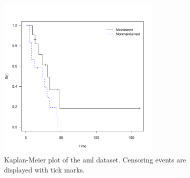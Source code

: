 \begin{figure}[H]
\centering
\includegraphics[width=0.7\textwidth]{figures/survival/aml_km.pdf}
\vspace{0.2cm}
\caption{
Kaplan-Meier plot of the aml dataset. Censoring events are displayed with tick marks.
}
\label{fig:aml_km}
\end{figure}

